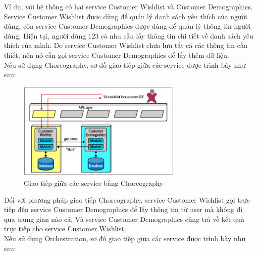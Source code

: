 Ví dụ, với hệ thống có hai service Customer Wishlist và Customer Demographics. Service Customer Wishlist được dùng để quản lý danh sách yêu thích của người dùng, còn service Customer Demographics được dùng để quản lý thông tin người dùng. Hiện tại, người dùng 123 có nhu cầu lấy thông tin chi tiết về danh sách yêu thích của mình. Do service Customer Wishlist chưa lưu tất cả các thông tin cần thiết, nên nó cần gọi service Customer Demographics để lấy thêm dữ liệu.\\

Nếu sử dụng Choreography, sơ đồ giao tiếp giữa các service được trình bày như sau:
\begin{figure}[!htp]
	\centering
	\includegraphics[width=8cm]{img/Architecture/choreography.PNG}
	\newline
	\caption{Giao tiếp giữa các service bằng Choreography \cite{archChoreography}}
\end{figure}

Đối với phương pháp giao tiếp Choreography, service Customer Wishlist gọi trực tiếp đến service Customer Demographics để lấy thông tin từ user mà không đi qua trung gian nào cả. Và service Customer Demographics cũng trả về kết quả trực tiếp cho service Customer Wishlist.\\

Nếu sử dụng Orchestration, sơ đồ giao tiếp giữa các service được trình bày như sau:

